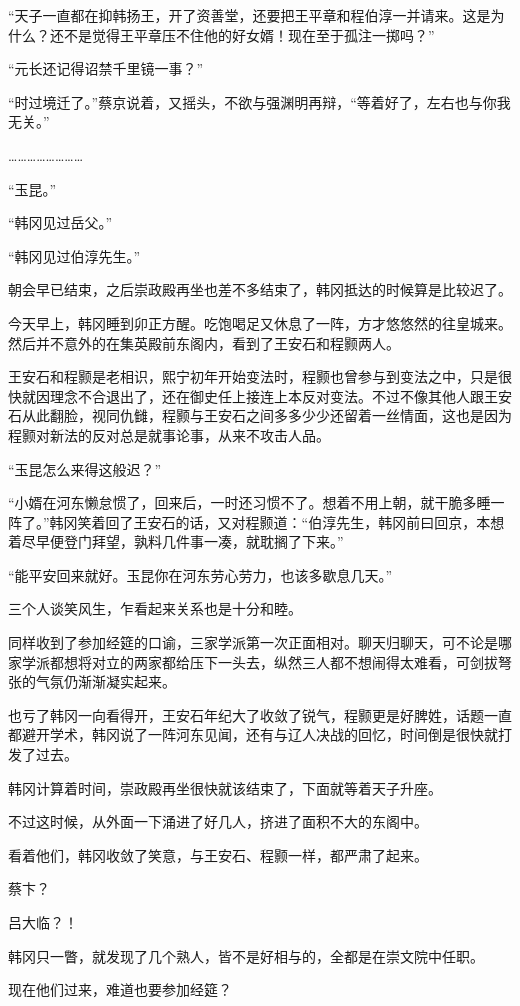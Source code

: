 “天子一直都在抑韩扬王，开了资善堂，还要把王平章和程伯淳一并请来。这是为什么？还不是觉得王平章压不住他的好女婿！现在至于孤注一掷吗？”

“元长还记得诏禁千里镜一事？”

“时过境迁了。”蔡京说着，又摇头，不欲与强渊明再辩，“等着好了，左右也与你我无关。”

……………………

“玉昆。”

“韩冈见过岳父。”

“韩冈见过伯淳先生。”

朝会早已结束，之后崇政殿再坐也差不多结束了，韩冈抵达的时候算是比较迟了。

今天早上，韩冈睡到卯正方醒。吃饱喝足又休息了一阵，方才悠悠然的往皇城来。然后并不意外的在集英殿前东阁内，看到了王安石和程颢两人。

王安石和程颢是老相识，熙宁初年开始变法时，程颢也曾参与到变法之中，只是很快就因理念不合退出了，还在御史任上接连上本反对变法。不过不像其他人跟王安石从此翻脸，视同仇雠，程颢与王安石之间多多少少还留着一丝情面，这也是因为程颢对新法的反对总是就事论事，从来不攻击人品。

“玉昆怎么来得这般迟？”

“小婿在河东懒怠惯了，回来后，一时还习惯不了。想着不用上朝，就干脆多睡一阵了。”韩冈笑着回了王安石的话，又对程颢道：“伯淳先生，韩冈前曰回京，本想着尽早便登门拜望，孰料几件事一凑，就耽搁了下来。”

“能平安回来就好。玉昆你在河东劳心劳力，也该多歇息几天。”

三个人谈笑风生，乍看起来关系也是十分和睦。

同样收到了参加经筵的口谕，三家学派第一次正面相对。聊天归聊天，可不论是哪家学派都想将对立的两家都给压下一头去，纵然三人都不想闹得太难看，可剑拔弩张的气氛仍渐渐凝实起来。

也亏了韩冈一向看得开，王安石年纪大了收敛了锐气，程颢更是好脾姓，话题一直都避开学术，韩冈说了一阵河东见闻，还有与辽人决战的回忆，时间倒是很快就打发了过去。

韩冈计算着时间，崇政殿再坐很快就该结束了，下面就等着天子升座。

不过这时候，从外面一下涌进了好几人，挤进了面积不大的东阁中。

看着他们，韩冈收敛了笑意，与王安石、程颢一样，都严肃了起来。

蔡卞？

吕大临？！

韩冈只一瞥，就发现了几个熟人，皆不是好相与的，全都是在崇文院中任职。

现在他们过来，难道也要参加经筵？

